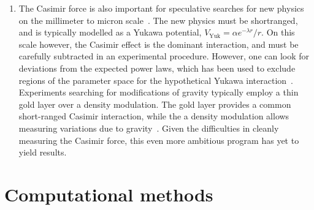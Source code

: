 \begin{enumerate}
\item The Casimir force is also important for speculative searches for new physics on the millimeter to micron
scale~\cite{Dimopoulos2003, Bezerra2011}.  The new physics must be shortranged, and is typically modelled as 
a Yukawa potential, $V_{\text{Yuk}}=\alpha e^{-\lambda r}/r$.  
On this scale however, the Casimir effect is the dominant interaction, and must be 
carefully subtracted in an experimental procedure.  However, one can look for deviations from the expected 
power laws, which has been used to exclude regions of the parameter space for the hypothetical
Yukawa interaction~\cite{Lamoreaux1997,Obrecht2007,Bezerra2011}.  
Experiments searching for modifications of gravity typically employ a thin gold layer over
a density modulation.  The gold layer provides a common short-ranged Casimir interaction, while the 
a density modulation allows measuring variations due to gravity~\cite{Sorrentino2009, Geraci2015}.
Given the difficulties in cleanly measuring the Casimir force, this even more ambitious program has yet 
to yield results.  
\end{enumerate}




\section{Computational methods}

